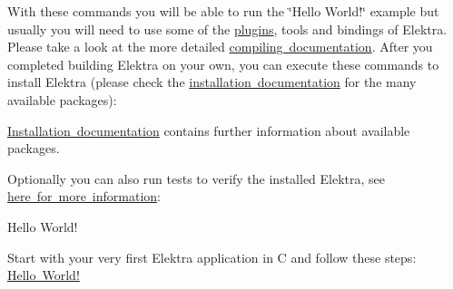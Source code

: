 \begin{DoxyCode}{0}

\end{DoxyCode}


With these commands you will be able to run the \char`\"{}\+Hello World!\char`\"{} example but usually you will need to use some of the \mbox{\hyperlink{src_plugins_README_md}{plugins}}, tools and bindings of Elektra. Please take a look at the more detailed \mbox{\hyperlink{doc_COMPILE_md}{compiling documentation}}. After you completed building Elektra on your own, you can execute these commands to install Elektra (please check the \mbox{\hyperlink{doc_INSTALL_md}{installation documentation}} for the many available packages)\+:


\begin{DoxyCode}{0}

\end{DoxyCode}


\mbox{\hyperlink{doc_INSTALL_md}{Installation documentation}} contains further information about available packages.

Optionally you can also run tests to verify the installed Elektra, see \mbox{\hyperlink{doc_TESTING_md}{here for more information}}\+:


\begin{DoxyCode}{0}

\end{DoxyCode}



\begin{DoxyItemize}
\item Hello World!

Start with your very first Elektra application in C and follow these steps\+: \mbox{\hyperlink{doc_tutorials_hello-elektra_md}{Hello World!}} 
\end{DoxyItemize}